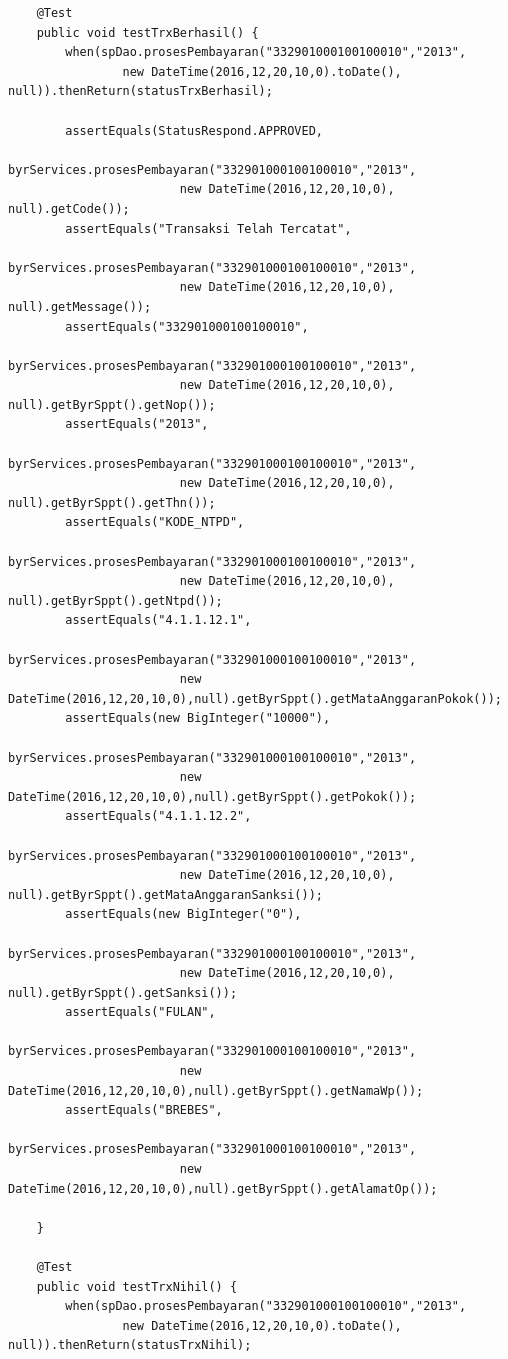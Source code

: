 \documentclass[pdftex,12pt, oneside]{article}
\begin{document}
\begin{enumerate}[A.]
\begin{enumerate}[1.]
\begin{lstlisting}
    @Test
    public void testTrxBerhasil() {
        when(spDao.prosesPembayaran("332901000100100010","2013",
                new DateTime(2016,12,20,10,0).toDate(), null)).thenReturn(statusTrxBerhasil);

        assertEquals(StatusRespond.APPROVED,
                byrServices.prosesPembayaran("332901000100100010","2013",
                        new DateTime(2016,12,20,10,0), null).getCode());
        assertEquals("Transaksi Telah Tercatat",
                byrServices.prosesPembayaran("332901000100100010","2013",
                        new DateTime(2016,12,20,10,0), null).getMessage());
        assertEquals("332901000100100010",
                byrServices.prosesPembayaran("332901000100100010","2013",
                        new DateTime(2016,12,20,10,0), null).getByrSppt().getNop());
        assertEquals("2013",
                byrServices.prosesPembayaran("332901000100100010","2013",
                        new DateTime(2016,12,20,10,0), null).getByrSppt().getThn());
        assertEquals("KODE_NTPD",
                byrServices.prosesPembayaran("332901000100100010","2013",
                        new DateTime(2016,12,20,10,0), null).getByrSppt().getNtpd());
        assertEquals("4.1.1.12.1",
                byrServices.prosesPembayaran("332901000100100010","2013",
                        new DateTime(2016,12,20,10,0),null).getByrSppt().getMataAnggaranPokok());
        assertEquals(new BigInteger("10000"),
                byrServices.prosesPembayaran("332901000100100010","2013",
                        new DateTime(2016,12,20,10,0),null).getByrSppt().getPokok());
        assertEquals("4.1.1.12.2",
                byrServices.prosesPembayaran("332901000100100010","2013",
                        new DateTime(2016,12,20,10,0), null).getByrSppt().getMataAnggaranSanksi());
        assertEquals(new BigInteger("0"),
                byrServices.prosesPembayaran("332901000100100010","2013",
                        new DateTime(2016,12,20,10,0), null).getByrSppt().getSanksi());
        assertEquals("FULAN",
                byrServices.prosesPembayaran("332901000100100010","2013",
                        new DateTime(2016,12,20,10,0),null).getByrSppt().getNamaWp());
        assertEquals("BREBES",
                byrServices.prosesPembayaran("332901000100100010","2013",
                        new DateTime(2016,12,20,10,0),null).getByrSppt().getAlamatOp());

    }

    @Test
    public void testTrxNihil() {
        when(spDao.prosesPembayaran("332901000100100010","2013",
                new DateTime(2016,12,20,10,0).toDate(), null)).thenReturn(statusTrxNihil);


\end{lstlisting}
\end{enumerate}
\end{enumerate}
\end{document}
